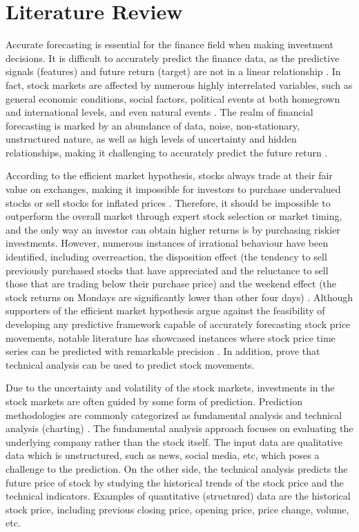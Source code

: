 \documentclass{article}
\begin{document}
\section{Literature Review}
\label{literatureReview}

Accurate forecasting is essential for the finance field when making investment decisions. It is difficult to accurately predict the finance data, as the predictive signals (features) and future return (target) are not in a linear relationship \citep{fischer2018deep}. In fact, stock markets are affected by numerous highly interrelated variables, such as general economic conditions, social factors, political events at both homegrown and international levels, and even natural events \citep{enke2005use, nti2020systematic}. The realm of financial forecasting is marked by an abundance of data, noise, non-stationary, unstructured nature, as well as high levels of uncertainty and hidden relationships, making it challenging to accurately predict the future return \citep{bao2004forecasting}.

According to the efficient market hypothesis, stocks always trade at their fair value on exchanges, making it impossible for investors to purchase undervalued stocks or sell stocks for inflated prices \citep{yen2008efficient}. Therefore, it should be impossible to outperform the overall market through expert stock selection or market timing, and the only way an investor can obtain higher returns is by purchasing riskier investments. However, numerous instances of irrational behaviour have been identified, including overreaction, the disposition effect (the tendency to sell previously purchased stocks that have appreciated and the reluctance to sell those that are trading below their purchase price) and the weekend effect (the stock returns on Mondays are significantly lower than other four days) \citep{hsu2016bridging}. Although supporters of the efficient market hypothesis argue against the feasibility of developing any predictive framework capable of accurately forecasting stock price movements, notable literature has showcased instances where stock price time series can be predicted with remarkable precision \citep{lewellen2002momentum, schwartz1977time}. In addition, \cite{lo2000foundations} prove that technical analysis can be used to predict stock movements.  

Due to the uncertainty and volatility of the stock markets, investments in the stock markets are often guided by some form of prediction. Prediction methodologies are commonly categorized as fundamental analysis and technical analysis (charting) \citep{attigeri2015stock, nti2020systematic, ican2017stock, li2015tensor}. The fundamental analysis approach focuses on evaluating the underlying company rather than the stock itself. The input data are qualitative data which is unstructured, such as news, social media, etc, which poses a challenge to the prediction. On the other side, the technical analysis predicts the future price of stock by studying the historical trends of the stock price and the technical indicators. Examples of quantitative (structured) data are the historical stock price, including previous closing price, opening price, price change, volume, etc. 
\end{document}
